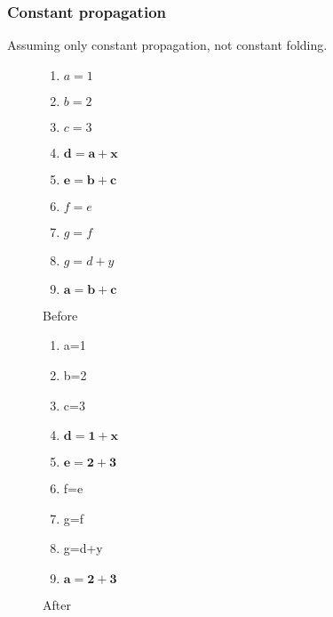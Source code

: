 \documentclass[a4paper]{article}
\begin{document}
\subsubsection{Constant propagation}
        \begin{flushleft}
        Assuming only constant propagation, not constant folding.
        \end{flushleft}
        \centering
        \begin{figure}[H]
            \centering
            \begin{varwidth}[b]{0.45\textwidth}
                \begin{enumerate}[1.]
                    \item $a=1$
                    \item $b=2$
                    \item $c=3$
                    \item {\color{red}$\mathbf{d=a+x}$}
                    \item {\color{red}$\mathbf{e=b+c}$}
                    \item $f=e$
                    \item $g=f$
                    \item $g=d+y$
                    \item {\color{red}$\mathbf{a=b+c}$}
                \end{enumerate}
                \caption{Before}
            \end{varwidth}
            \begin{varwidth}[b]{0.45\textwidth}
                \begin{enumerate}[1.]
                    \item a=1
                    \item b=2
                    \item c=3
                    \item {\color{red}$\mathbf{d=1+x}$}
                    \item {\color{red}$\mathbf{e=2+3}$}
                    \item f=e
                    \item g=f
                    \item g=d+y
                    \item {\color{red}$\mathbf{a=2+3}$}
                \end{enumerate}
                \caption{After}
            \end{varwidth}
        \end{figure}
\end{document}
